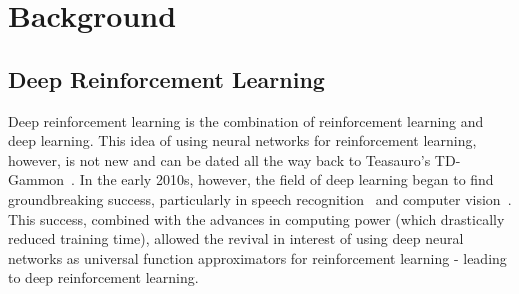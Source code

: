 
\chapter{Background}
\vspace{2em}

\section{Deep Reinforcement Learning}

Deep reinforcement learning is the combination of reinforcement learning and deep learning. This idea of using neural networks for reinforcement learning, however, is not new and can be dated all the way back to Teasauro's TD-Gammon~\cite{tesauro_temporal_nodate}. In the early 2010s, however, the field of deep learning began to find groundbreaking success, particularly in speech recognition~\cite{dahl_context-dependent_2012} and computer vision~\cite{krizhevsky_imagenet_2017}. This success, combined with the advances in computing power (which drastically reduced training time), allowed the revival in interest of using deep neural networks as universal function approximators for reinforcement learning - leading to deep reinforcement learning.
